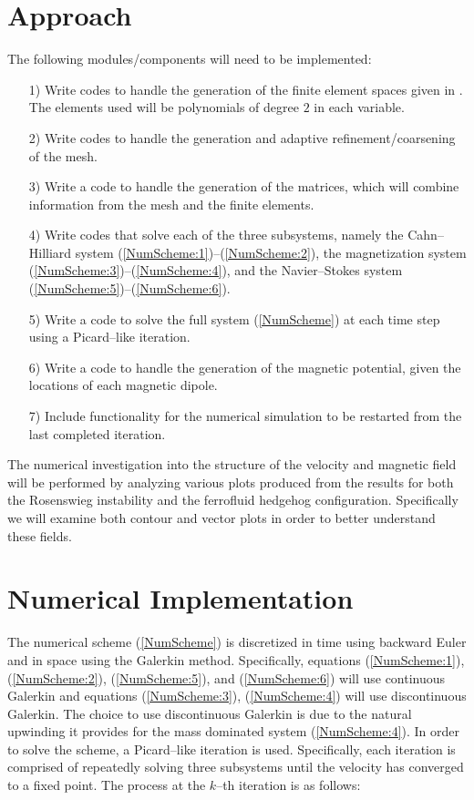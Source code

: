\documentclass[11pt,fullpage]{article}
\theoremstyle{lemma}
\theoremstyle{definition}
\theoremstyle{lemma}
\begin{document}
\section{Approach}
The following modules/components will need to be implemented:
\begin{itemize}
	\item[1)] Write codes to handle the generation of the finite element spaces given in \cite{DiffuseInterface}. The elements used will be polynomials of degree $2$ in each variable.
	
	\item[2)] Write codes to handle the generation and adaptive refinement/coarsening of the mesh.
	
	\item[3)] Write a code to handle the generation of the matrices, which will combine information from the mesh and the finite elements. 
	
	\item[4)] Write codes that solve each of the three subsystems, namely the Cahn--Hilliard system (\ref{NumScheme:1})--(\ref{NumScheme:2}), the magnetization system (\ref{NumScheme:3})--(\ref{NumScheme:4}), and the Navier--Stokes system (\ref{NumScheme:5})--(\ref{NumScheme:6}).
	
	\item[5)] Write a code to solve the full system (\ref{NumScheme}) at each time step using a Picard--like iteration.
	
	\item[6)] Write a code to handle the generation of the magnetic potential, given the locations of each magnetic dipole.
	
	\item[7)] Include functionality for the numerical simulation to be restarted from the last completed iteration.
\end{itemize}
The numerical investigation into the structure of the velocity and magnetic field will be performed by analyzing various plots produced from the results for both the Rosenswieg instability and the ferrofluid hedgehog configuration. Specifically we will examine both contour and vector plots in order to better understand these fields.


\section{Numerical Implementation}
The numerical scheme (\ref{NumScheme}) is discretized in time using backward Euler and in space using the Galerkin method. Specifically, equations (\ref{NumScheme:1}), (\ref{NumScheme:2}), (\ref{NumScheme:5}), and (\ref{NumScheme:6}) will use continuous Galerkin and equations (\ref{NumScheme:3}), (\ref{NumScheme:4}) will use discontinuous Galerkin. The choice to use discontinuous Galerkin is due to the natural upwinding it provides for the mass dominated system (\ref{NumScheme:4}). In order to solve the scheme, a Picard--like iteration is used. Specifically, each iteration is comprised of repeatedly solving three subsystems until the velocity has converged to a fixed point. The process at the $k$--th iteration is as follows: 
\end{document}
